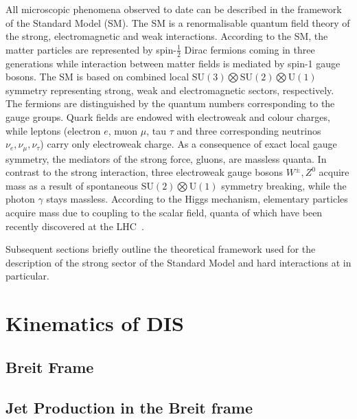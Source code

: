 All microscopic phenomena observed to date can be described in the framework of the Standard Model (SM). The SM is a renormalisable quantum field theory of the strong, electromagnetic and weak interactions. According to the SM, the matter particles are represented by spin-$\frac{1}{2}$ Dirac fermions coming in three generations while interaction between matter fields is mediated by spin-1 gauge bosons. The SM is based on combined local $\mathrm{SU}\left(3\right) \bigotimes \mathrm{SU}\left(2\right) \bigotimes \mathrm{U}\left(1\right)$ symmetry representing strong, weak and electromagnetic sectors, respectively. The fermions are distinguished by the quantum numbers corresponding to the gauge groups. Quark fields are endowed with electroweak and colour charges, while leptons (electron $e$, muon $\mu$, tau $\tau$ and three corresponding neutrinos $\nu_e, \nu_\mu, \nu_\tau$) carry only electroweak charge. As a consequence of exact local gauge symmetry, the mediators of the strong force, gluons, are massless quanta. In contrast to the strong interaction, three electroweak gauge bosons $W^\pm, Z^0$ acquire mass as a result of spontaneous $\mathrm{SU}\left(2\right) \bigotimes \mathrm{U}\left(1\right)$ symmetry breaking, while the photon $\gamma$ stays massless. According to the Higgs mechanism, elementary particles acquire mass due to coupling to the scalar field, quanta of which have been recently discovered at the LHC~\cite{higgs atlas cms}.

Subsequent sections briefly outline the theoretical framework used for the description of the strong sector of the Standard Model and hard interactions at \hera in particular.

\section{Kinematics of DIS}
\label{sec:kindis}


\subsection{Breit Frame}
\label{subsec:breitframe}


\subsection{Jet Production in the Breit frame}
\label{subsec:jetsinbreit}



